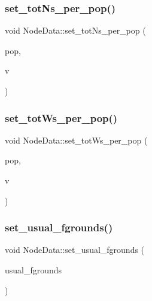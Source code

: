 \subsubsection{\texorpdfstring{set\_totNs\_per\_pop()}{set\_totNs\_per\_pop()}}
{\footnotesize\ttfamily void Node\+Data\+::set\+\_\+tot\+Ns\+\_\+per\+\_\+pop (\begin{DoxyParamCaption}\item[{int}]{pop,  }\item[{int}]{v }\end{DoxyParamCaption})\hspace{0.3cm}{\ttfamily [inline]}}

\mbox{\label{class_node_data_aaeb6976e27f095a06820ac6836abf4e3}} 
\subsubsection{\texorpdfstring{set\_totWs\_per\_pop()}{set\_totWs\_per\_pop()}}
{\footnotesize\ttfamily void Node\+Data\+::set\+\_\+tot\+Ws\+\_\+per\+\_\+pop (\begin{DoxyParamCaption}\item[{int}]{pop,  }\item[{int}]{v }\end{DoxyParamCaption})\hspace{0.3cm}{\ttfamily [inline]}}

\mbox{\label{class_node_data_a8bd37a5138e6ae24633994cc55d4596b}} 
\subsubsection{\texorpdfstring{set\_usual\_fgrounds()}{set\_usual\_fgrounds()}}
{\footnotesize\ttfamily void Node\+Data\+::set\+\_\+usual\+\_\+fgrounds (\begin{DoxyParamCaption}\item[{vector$<$ \mbox{\hyperlink{classtypes_1_1_node_id}{types\+::\+Node\+Id}} $>$}]{usual\+\_\+fgrounds }\end{DoxyParamCaption})\hspace{0.3cm}{\ttfamily [inline]}}

